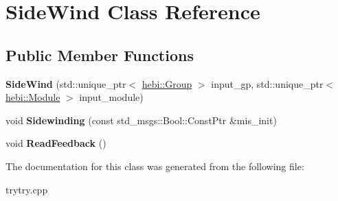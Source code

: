 \hypertarget{classSideWind}{}\section{Side\+Wind Class Reference}
\label{classSideWind}
\subsection*{Public Member Functions}
\begin{DoxyCompactItemize}
\item 
{\bfseries Side\+Wind} (std\+::unique\+\_\+ptr$<$ \hyperlink{classhebi_1_1Group}{hebi\+::\+Group} $>$ input\+\_\+gp, std\+::unique\+\_\+ptr$<$ \hyperlink{classhebi_1_1Module}{hebi\+::\+Module} $>$ input\+\_\+module)\hypertarget{classSideWind_aa32584d09d0ce6f7c8db56a7fddcfba0}{}\label{classSideWind_aa32584d09d0ce6f7c8db56a7fddcfba0}

\item 
void {\bfseries Sidewinding} (const std\+\_\+msgs\+::\+Bool\+::\+Const\+Ptr \&mis\+\_\+init)\hypertarget{classSideWind_addb592f9e571ab41f00dee606377119f}{}\label{classSideWind_addb592f9e571ab41f00dee606377119f}

\item 
void {\bfseries Read\+Feedback} ()\hypertarget{classSideWind_a5b28d72a4fb9cedb1418e52b895e58c7}{}\label{classSideWind_a5b28d72a4fb9cedb1418e52b895e58c7}

\end{DoxyCompactItemize}


The documentation for this class was generated from the following file\+:\begin{DoxyCompactItemize}
\item 
trytry.\+cpp\end{DoxyCompactItemize}

